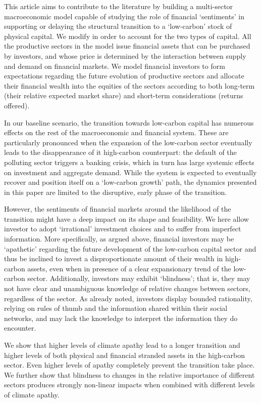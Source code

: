 \documentclass[authoryear]{article}
\begin{document}
This article aims to contribute to the literature by building a multi-sector macroeconomic model capable of studying the role of financial `sentiments' in supporting or delaying the structural transition to a `low-carbon' stock of physical capital. We modify \citet{Caiani2014} in order to account for the two types of capital. All the productive sectors in the model issue financial assets that can be purchased by investors, and whose price is determined by the interaction between supply and demand on financial markets. We model financial investors to form expectations regarding the future evolution of productive sectors and allocate their financial wealth into the equities of the sectors according to both long-term (their relative expected market share) and short-term considerations (returns offered).

In our baseline scenario, the transition towards low-carbon capital has numerous effects on the rest of the macroeconomic and financial system. These are particularly pronounced when the expansion of the low-carbon sector eventually leads to the disappearance of it high-carbon counterpart: the default of the polluting sector triggers a banking crisis, which in turn has large systemic effects on investment and aggregate demand. While the system is expected to eventually recover and position itself on a `low-carbon growth' path, the dynamics presented in this paper are limited to the disruptive, early phase of the transition.

However, the sentiments of financial markets around the likelihood of the transition might have a deep impact on its shape and feasibility. We here allow investor to adopt `irrational' investment choices and to suffer from imperfect information. More specifically, as argued above, financial investors may be `apathetic' regarding the future development of the low-carbon capital sector and thus be inclined to invest a disproportionate amount of their wealth in high-carbon assets, even when in presence of a clear expansionary trend of the low-carbon sector. Additionally, investors may exhibit `blindness'; that is, they may not have clear and unambiguous knowledge of relative changes between sectors, regardless of the sector. As already noted, investors display bounded rationality, relying on rules of thumb and the information shared within their social networks, and may lack the knowledge to interpret the information they do encounter.

We show that higher levels of  climate apathy lead to a longer transition and higher levels of both physical and financial stranded assets in the high-carbon sector. Even higher levels of apathy completely prevent the transition take place. We further show that blindness to changes in the relative importance of different sectors produces strongly non-linear impacts when combined with different levels of climate apathy. 
\end{document}
